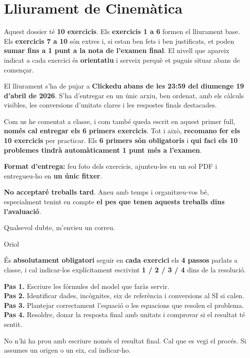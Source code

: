 \documentclass[11pt,a4paper]{article}
\begin{document}
\section*{Lliurament de Cinemàtica}

Aquest dossier té \textbf{10 exercicis}. Els \textbf{exercicis 1 a 6} formen el lliurament base. Els \textbf{exercicis 7 a 10} són extres i, si estan ben fets i ben justificats, et poden \textbf{sumar fins a 1 punt a la nota de l'examen final}. El nivell que apareix indicat a cada exercici és \textbf{orientatiu} i serveix perquè et puguis situar abans de començar.

El lliurament s'ha de pujar a \textbf{Clickedu} \textbf{abans de les 23:59 del diumenge 19 d'abril de 2026}. S'ha d'entregar en un únic arxiu, ben ordenat, amb els càlculs visibles, les conversions d'unitats clares i les respostes finals destacades.

Com us he comentat a classe, i com també queda escrit en aquest primer full, \textbf{només cal entregar els 6 primers exercicis}. Tot i això, \textbf{recomano fer els 10 exercicis} per practicar. Els \textbf{6 primers són obligatoris} i \textbf{qui faci els 10 problemes tindrà automàticament 1 punt més a l'examen}.

\textbf{Format d'entrega:} feu foto dels exercicis, ajunteu-les en un sol PDF i entregueu-ho en \textbf{un únic fitxer}.

\textbf{No acceptaré treballs tard}. Aneu amb temps i organitzeu-vos bé, especialment tenint en compte \textbf{el pes que tenen aquests treballs dins l'avaluació}.

Qualsevol dubte, m'envieu un correu.

\hfill Oriol

És \textbf{absolutament obligatori} seguir en \textbf{cada exercici} els \textbf{4 passos} parlats a classe, i cal indicar-los explícitament escrivint \textbf{1 / 2 / 3 / 4} dins de la resolució.

\textbf{Pas 1.} Escriure les fórmules del model que faràs servir.\\
\textbf{Pas 2.} Identificar dades, incògnites, eix de referència i conversions al SI si calen.\\
\textbf{Pas 3.} Plantejar correctament l'equació o les equacions que resolen el problema.\\
\textbf{Pas 4.} Resoldre, donar la resposta final amb unitats i comprovar si el resultat té sentit.

No n'hi ha prou amb escriure només el resultat final. Cal que es vegi el procés. Si assumes un origen o un eix, cal indicar-ho.
\end{document}
